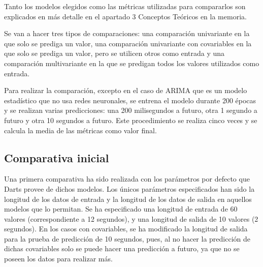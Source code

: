 Tanto los modelos elegidos como las métricas utilizadas para compararlos son explicados en más detalle en el apartado 3 Conceptos
Teóricos en la memoria.

Se van a hacer tres tipos de comparaciones: una comparación univariante en la que solo se prediga un valor, 
una comparación univariante con covariables en la que solo se prediga un valor, pero se utilicen otros como entrada y 
una comparación multivariante en la que se predigan todos los valores utilizados como entrada.


Para realizar la comparación, excepto en el caso de ARIMA que es un modelo estadístico que no usa redes neuronales, 
se entrena el modelo durante 200 épocas y se realizan varias predicciones: una 200 milisegundos a futuro, otra 
1 segundo a futuro y otra 10 segundos a futuro. Este procedimiento se realiza cinco veces y se calcula la media 
de las métricas como valor final.

\subsection{Comparativa inicial}

Una primera comparativa ha sido realizada con los parámetros por defecto que Darts provee de dichos modelos. 
Los únicos parámetros especificados han sido la longitud de los datos de entrada y la longitud de los datos de salida 
en aquellos modelos que lo permitan. Se ha especificado una longitud de entrada de 60 valores 
(correspondiente a 12 segundos), y una longitud de salida de 10 valores (2 segundos). En los casos con covariables,
se ha modificado la longitud de salida para la prueba de predicción de 10 segundos, pues, al no hacer la predicción 
de dichas covariables solo se puede hacer una predicción a futuro, ya que no se poseen los datos para realizar más.


